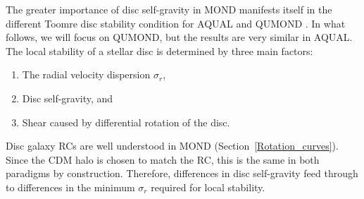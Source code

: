 \documentclass[fleqn,usenatbib,useAMS,onecolumn]{mnras} %
\begin{document}
The greater importance of disc self-gravity in MOND manifests itself in the different Toomre disc stability condition \citep{Toomre_1964} for AQUAL \citep{Milgrom_1989} and QUMOND \citep{Banik_2018_Toomre}. In what follows, we will focus on QUMOND, but the results are very similar in AQUAL. The local stability of a stellar disc is determined by three main factors:
\begin{enumerate}
	\item The radial velocity dispersion $\sigma_r$,
	\item Disc self-gravity, and
	\item Shear caused by differential rotation of the disc.
\end{enumerate}
Disc galaxy RCs are well understood in MOND (Section~\ref{Rotation_curves}). Since the CDM halo is chosen to match the RC, this is the same in both paradigms by construction. Therefore, differences in disc self-gravity feed through to differences in the minimum $\sigma_r$ required for local stability.
\end{document}
